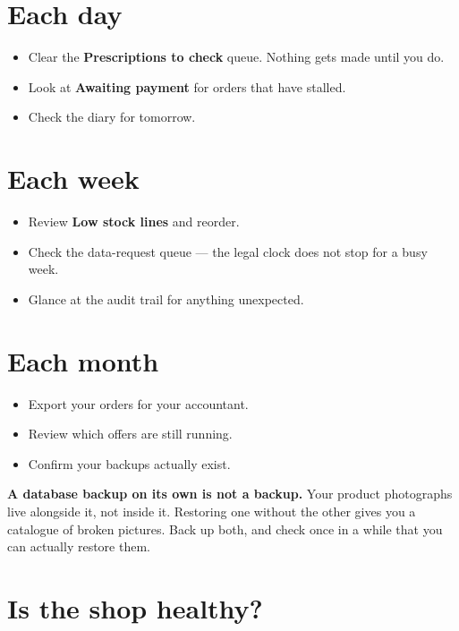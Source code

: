 \documentclass[11pt,a4paper]{report}
\begin{document}
\section{Each day}

\begin{itemize}
  \item Clear the \textbf{Prescriptions to check} queue. Nothing gets
        made until you do.
  \item Look at \textbf{Awaiting payment} for orders that have stalled.
  \item Check the diary for tomorrow.
\end{itemize}

\section{Each week}

\begin{itemize}
  \item Review \textbf{Low stock lines} and reorder.
  \item Check the data-request queue --- the legal clock does not stop
        for a busy week.
  \item Glance at the audit trail for anything unexpected.
\end{itemize}

\section{Each month}

\begin{itemize}
  \item Export your orders for your accountant.
  \item Review which offers are still running.
  \item Confirm your backups actually exist.
\end{itemize}

\begin{warnbox}
\textbf{A database backup on its own is not a backup.} Your product
photographs live alongside it, not inside it. Restoring one without the
other gives you a catalogue of broken pictures. Back up both, and check
once in a while that you can actually restore them.
\end{warnbox}

\section{Is the shop healthy?}
\end{document}
